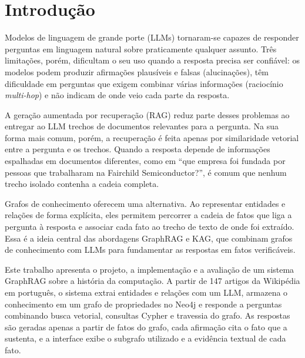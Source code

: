 
\section{Introdução}

Modelos de linguagem de grande porte (LLMs) tornaram-se capazes de responder perguntas em linguagem natural sobre praticamente qualquer assunto. Três limitações, porém, dificultam o seu uso quando a resposta precisa ser confiável: os modelos podem produzir afirmações plausíveis e falsas (alucinações), têm dificuldade em perguntas que exigem combinar várias informações (raciocínio \emph{multi-hop}) e não indicam de onde veio cada parte da resposta.

A geração aumentada por recuperação (RAG) reduz parte desses problemas ao entregar ao LLM trechos de documentos relevantes para a pergunta. Na sua forma mais comum, porém, a recuperação é feita apenas por similaridade vetorial entre a pergunta e os trechos. Quando a resposta depende de informações espalhadas em documentos diferentes, como em ``que empresa foi fundada por pessoas que trabalharam na Fairchild Semiconductor?'', é comum que nenhum trecho isolado contenha a cadeia completa.

Grafos de conhecimento oferecem uma alternativa. Ao representar entidades e relações de forma explícita, eles permitem percorrer a cadeia de fatos que liga a pergunta à resposta e associar cada fato ao trecho de texto de onde foi extraído. Essa é a ideia central das abordagens GraphRAG e KAG, que combinam grafos de conhecimento com LLMs para fundamentar as respostas em fatos verificáveis.

Este trabalho apresenta o projeto, a implementação e a avaliação de um sistema GraphRAG sobre a história da computação. A partir de 147 artigos da Wikipédia em português, o sistema extrai entidades e relações com um LLM, armazena o conhecimento em um grafo de propriedades no Neo4j e responde a perguntas combinando busca vetorial, consultas Cypher e travessia do grafo. As respostas são geradas apenas a partir de fatos do grafo, cada afirmação cita o fato que a sustenta, e a interface exibe o subgrafo utilizado e a evidência textual de cada fato.

